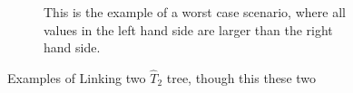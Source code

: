 \documentclass{article}
\begin{document}
\begin{figure}
\begin{center}
\begin{subfigure}{0.8\linewidth}
\begin{center}
\end{center}
\caption{This is the example of a worst case scenario, where all values in the left hand side are larger than the right hand side.}
\end{subfigure}
\end{center}

\caption{Examples of Linking two $\hat{T}_2$ tree, though this these two }
\end{figure}
\end{document}
